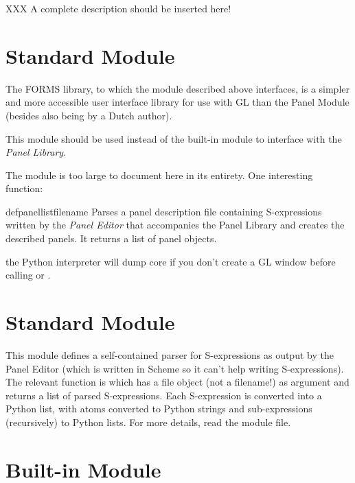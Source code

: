 XXX A complete description should be inserted here!

\section{Standard Module }

 The FORMS library, to which the  module described
above interfaces, is a simpler and more accessible user interface
library for use with GL than the Panel Module (besides also being by a
Dutch author).

This module should be used instead of the built-in module
to interface with the
{\em Panel Library}.

The module is too large to document here in its entirety.
One interesting function:

\renewcommand{\indexsubitem}{(in module panel)}
\begin{funcdesc}{defpanellist}{filename}
Parses a panel description file containing S-expressions written by the
{\em Panel Editor}
that accompanies the Panel Library and creates the described panels.
It returns a list of panel objects.
\end{funcdesc}

the Python interpreter will dump core if you don't create a GL window
before calling
or
.

\section{Standard Module }

This module defines a self-contained parser for S-expressions as output
by the Panel Editor (which is written in Scheme so it can't help writing
S-expressions).
The relevant function is
which has a file object (not a filename!) as argument and returns a list
of parsed S-expressions.
Each S-expression is converted into a Python list, with atoms converted
to Python strings and sub-expressions (recursively) to Python lists.
For more details, read the module file.

\section{Built-in Module }


